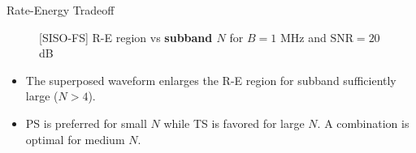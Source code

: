 \documentclass[xcolor={table}]{beamer}
\begin{document}
\begin{frame}[fragile=singleslide,t]
\begin{columns}[onlytextwidth,T]
\begin{column}{.47\textwidth}
\begin{block}{Rate-Energy Tradeoff}
\begin{figure}
  \centering
  \caption{[SISO-FS] R-E region vs \textbf{subband $N$} for $B = 1$ MHz and ${\text{SNR}} = 20$ dB}\label{fig:subband}
\end{figure}
\begin{itemize}
  \item The superposed waveform enlarges the R-E region for subband sufficiently large ($N > 4$).
  \item PS is preferred for small $N$ while TS is favored for large $N$. A combination is optimal for medium $N$.
\end{itemize}
\begin{figure}
  \centering
  \subfigure[${\text{SNR}} = 40$ dB]{
}
\end{figure}
\end{block}
\end{column}
\end{columns}
\end{frame}
\end{document}
